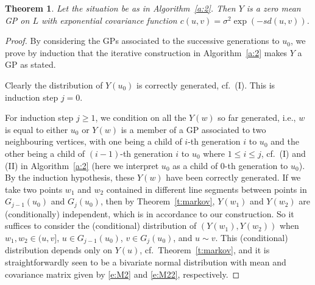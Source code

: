 \documentclass[alpha-refs]{wiley-article}
\newtheorem{thm}{Theorem}
\begin{document}
\begin{thm}\label{t:simalgotree}
	Let the situation be as in Algorithm~\ref{a:2}.
	Then $Y$ is a zero mean GP on $L$ with exponential covariance function $c(u,v)=\sigma^2\exp(-s d(u, v))$. %
\end{thm} 

\begin{proof}
	By considering the GPs associated to the successive generations to $u_0$, we prove by induction that %
	the iterative construction in Algorithm~\ref{a:2} makes $Y$ a GP as stated. 
	
	Clearly the distribution of $Y(u_0)$ is correctly generated, cf.\ (I). This is induction step $j=0$. 
	
	For induction step $j\ge1$, we condition on all the $Y(w)$ so far generated, i.e., $w$ is equal to either $u_0$ or $Y(w)$ is a member of a GP associated to two neighbouring vertices, with one being a child of $i$-th generation $i$ to $u_0$ and the other being a child of $(i-1)$-th generation $i$ to $u_0$ where $1\le i\le j$, cf.\ (I) and (II) in Algorithm~\ref{a:2} 
	(here we interpret $u_0$ as a child of $0$-th generation to $u_0$). 
	By the induction hypothesis, these $Y(w)$ have been correctly generated. If we take two points $w_1$ and $w_2$ contained in different line segments between points in $G_{j-1}(u_0)$ and $G_j(u_0)$, then by Theorem~\ref{t:markov}, $Y(w_1)$ and $Y(w_2)$ are (conditionally) independent, which is in accordance to our construction. So it suffices to consider the (conditional) distribution of $(Y(w_1),Y(w_2))$ when $w_1,w_2\in(u,v]$, $u\in G_{j-1}(u_0)$, $v\in G_j(u_0)$, and $u\sim v$. This (conditional) distribution depends only on $Y(u)$, cf.\ Theorem~\ref{t:markov}, and it is straightforwardly seen to be  
a bivariate normal distribution with mean and covariance matrix given by \eqref{e:M2} and \eqref{e:M22}, respectively.	

\end{proof}
\end{document}
